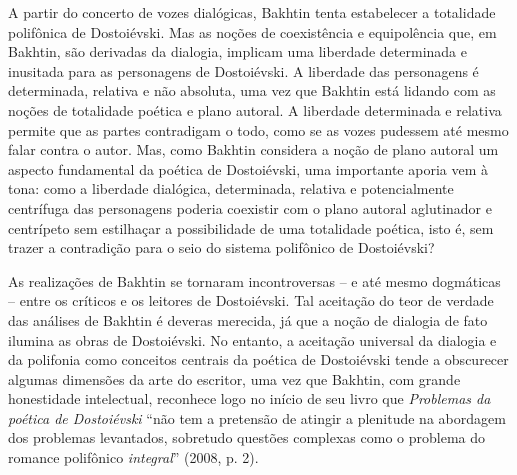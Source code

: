 A partir do concerto de vozes dialógicas, Bakhtin tenta estabelecer a
totalidade polifônica de Dostoiévski. Mas as noções de coexistência e
equipolência que, em Bakhtin, são derivadas da dialogia, implicam uma
liberdade determinada e inusitada para as personagens de Dostoiévski. A
liberdade das personagens é determinada, relativa e não absoluta, uma
vez que Bakhtin está lidando com as noções de totalidade poética e plano
autoral. A liberdade determinada e relativa permite que as partes
contradigam o todo, como se as vozes pudessem até mesmo falar contra o
autor. Mas, como Bakhtin considera a noção de plano autoral um aspecto
fundamental da poética de Dostoiévski, uma importante aporia vem à tona:
como a liberdade dialógica, determinada, relativa e potencialmente
centrífuga das personagens poderia coexistir com o plano autoral
aglutinador e centrípeto sem estilhaçar a possibilidade de uma
totalidade poética, isto é, sem trazer a contradição para o seio do
sistema polifônico de Dostoiévski?

As realizações de Bakhtin se tornaram incontroversas -- e até mesmo
dogmáticas -- entre os críticos e os leitores de Dostoiévski. Tal
aceitação do teor de verdade das análises de Bakhtin é deveras merecida,
já que a noção de dialogia de fato ilumina as obras de Dostoiévski. No
entanto, a aceitação universal da dialogia e da polifonia como conceitos
centrais da poética de Dostoiévski tende a obscurecer algumas dimensões
da arte do escritor, uma vez que Bakhtin, com grande honestidade
intelectual, reconhece logo no início de seu livro que \emph{Problemas
da poética de Dostoiévski} ``não tem a pretensão de atingir a plenitude
na abordagem dos problemas levantados, sobretudo questões complexas como
o problema do romance polifônico \emph{integral}'' (2008, p. 2).

